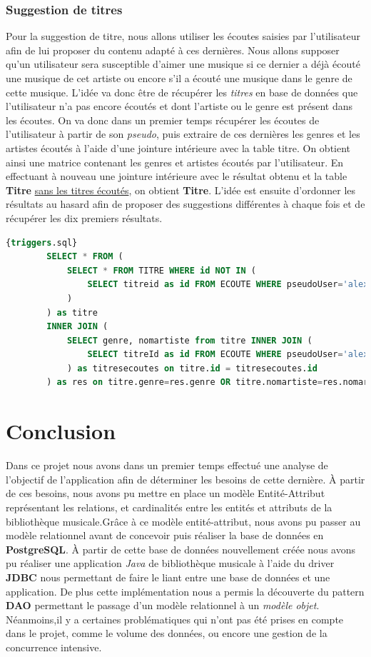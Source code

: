 \documentclass[a4paper,12pt, french]{report}
\begin{document}
		\subsection{Suggestion de titres}
		Pour la suggestion de titre, nous allons utiliser les écoutes saisies par l'utilisateur afin de lui proposer du contenu adapté à ces dernières. Nous allons supposer qu'un utilisateur sera susceptible d'aimer une musique si ce dernier a déjà écouté une musique de cet artiste ou encore s'il a écouté une musique dans le genre de cette musique. L'idée va donc être de récupérer les \emph{titres} en base de données que l'utilisateur n'a pas encore écoutés et dont l'artiste ou le genre est présent dans les écoutes. On va donc dans un premier temps récupérer les écoutes de l'utilisateur à partir de son \emph{pseudo}, puis extraire de ces dernières les genres et les artistes écoutés à l'aide d'une jointure intérieure avec la table titre. On obtient ainsi une matrice contenant les genres et artistes écoutés par l'utilisateur. En effectuant à nouveau une jointure intérieure avec le résultat obtenu et la table \textbf{Titre} \underline{sans les titres écoutés}, on obtient  \textbf{Titre}. L'idée est ensuite d'ordonner les résultats au hasard afin de proposer des suggestions différentes à chaque fois et de récupérer les dix premiers résultats.
		\begin{lstlisting}[language=SQL, label=rechercher,caption=Exemple de requête de suggestion , breaklines, frame=single]{triggers.sql}
		SELECT * FROM (
			SELECT * FROM TITRE WHERE id NOT IN (
				SELECT titreid as id FROM ECOUTE WHERE pseudoUser='alexis'
			)
		) as titre 	
		INNER JOIN (
			SELECT genre, nomartiste from titre INNER JOIN (
				SELECT titreId as id FROM ECOUTE WHERE pseudoUser='alexis'
			) as titresecoutes on titre.id = titresecoutes.id
		) as res on titre.genre=res.genre OR titre.nomartiste=res.nomartiste ORDER BY RANDOM() limit 10;
		\end{lstlisting}
	
		
\chapter*{Conclusion}
	Dans ce projet nous avons dans un premier temps effectué une analyse de l'objectif de l'application afin de déterminer les besoins de cette dernière. À partir de ces besoins, nous avons pu mettre en place un modèle Entité-Attribut représentant les relations, et cardinalités entre les entités et attributs de la bibliothèque musicale.Grâce à ce modèle entité-attribut, nous avons pu passer au modèle relationnel avant de concevoir puis réaliser la base de données en \textbf{PostgreSQL}. À partir de cette base de données nouvellement créée nous avons pu réaliser une application \emph{Java} de bibliothèque musicale à l'aide du driver \textbf{JDBC} nous permettant de faire le liant entre une base de données et une application. De plus cette implémentation nous a permis la découverte du pattern \textbf {DAO} permettant le passage d'un modèle relationnel à un \emph{modèle objet}. Néanmoins,il y a certaines problématiques qui n'ont pas été prises en compte dans le projet, comme le volume des données, ou encore une gestion de la concurrence intensive. 
\end{document}
